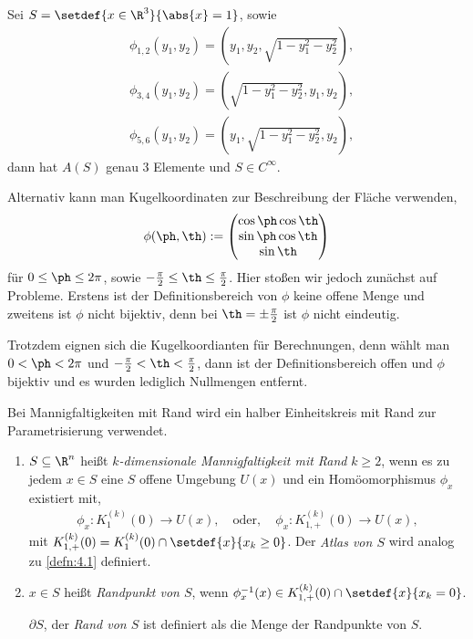 \begin{bsp}
\label{bsp:4.2}
Sei $S=\setdef{x\in\R^3}{\abs{x} = 1}$, sowie
\begin{align*}
&\phi_{1,2}(y_1,y_2) = \left(y_1, y_2, \sqrt{1-y_1^2-y_2^2} \right),\\
&\phi_{3,4}(y_1,y_2) = \left(\sqrt{1-y_1^2-y_2^2}, y_1, y_2 \right),\\
&\phi_{5,6}(y_1,y_2) = \left(y_1, \sqrt{1-y_1^2-y_2^2}, y_2 \right),
\end{align*}
dann hat $A(S)$ genau $3$ Elemente und $S\in C^\infty$.

Alternativ kann man Kugelkoordinaten zur Beschreibung der Fläche verwenden,
\begin{align*}
\phi(\ph,\th) := \begin{pmatrix}
\cos\ph \cos\th\\
\sin\ph\cos\th\\
\sin\th
\end{pmatrix}
\end{align*}
für $0\le\ph\le 2\pi$, sowie $-\frac{\pi}{2}\le \th\le \frac{\pi}{2}$.
Hier stoßen wir jedoch zunächst auf Probleme. Erstens ist der
Definitionsbereich von $\phi$ keine offene Menge und zweitens ist $\phi$ nicht
bijektiv, denn bei $\th = \pm \frac{\pi}{2}$ ist $\phi$ nicht eindeutig.

Trotzdem eignen sich die Kugelkoordianten für Berechnungen, denn wählt
man $0<\ph<2\pi$ und $-\frac{\pi}{2}< \th< \frac{\pi}{2}$, dann ist der
Definitionsbereich offen und $\phi$ bijektiv und es wurden lediglich Nullmengen
entfernt.\bsphere
\end{bsp}
Bei Mannigfaltigkeiten mit Rand wird ein halber Einheitskreis mit Rand zur
Parametrisierung verwendet.
\begin{defn}
\label{defn:4.3}
\begin{enumerate}[label=\arabic{*}.)]
  \item $S\subseteq\R^n$ heißt \emph{$k$-dimensionale Mannigfaltigkeit mit
  Rand} $k\ge 2$, wenn es zu jedem $x\in S$ eine $S$ offene Umgebung $U(x)$ und
  ein Homöomorphismus $\phi_x$ existiert mit,
\begin{align*}
\phi_x: K_1^{(k)}(0)\to U(x),
\quad\text{oder},\quad
\phi_x: K_{1,+}^{(k)}(0)\to U(x),
\end{align*}
mit $K_{1,+}^{(k)}(0) = K_1^{(k)}(0)\cap \setdef{x}{x_k \ge 0}$. Der
\emph{Atlas von $S$} wird analog zu \ref{defn:4.1} definiert.
\item $x\in S$ heißt \emph{Randpunkt von $S$}, wenn $\phi_x^{-1}(x) \in 
K_{1,+}^{(k)}(0)\cap \setdef{x}{x_k=0}$.

$\partial S$, der \emph{Rand von $S$} ist definiert als die Menge der Randpunkte
von $S$.\fishhere
\end{enumerate}
\end{defn}

